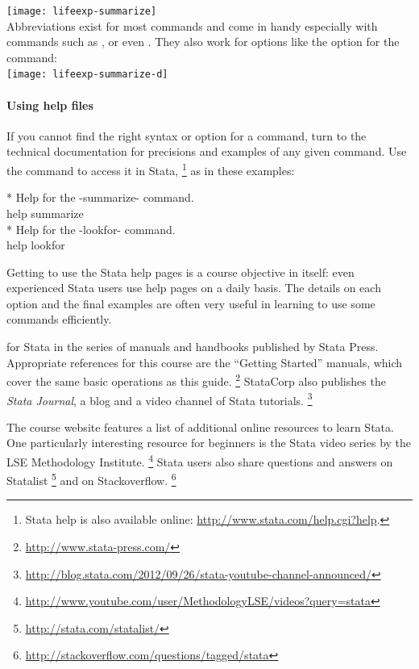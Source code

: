     \texttt{[image: lifeexp-summarize]}\\[1em]

  Abbreviations exist for most commands and come in handy especially with commands such as ,  or even . They also work for options like the  option for the  command:\\[1em]%

    \texttt{[image: lifeexp-summarize-d]}\\[1em]
  
    \paragraph{Using help files}%

    If you cannot find the right syntax or option for a command, turn to the technical documentation for precisions and examples of any given command. Use the  command to access it in Stata,%
        \footnote{Stata help is also available online: \url{http://www.stata.com/help.cgi?help}.} %
        as in these examples:%

    \begin{docspec}
      * Help for the -summarize- command.\\
      help summarize\\[1em]
  
      * Help for the -lookfor- command.\\
      help lookfor
    \end{docspec}

    Getting to use the Stata help pages is a course objective in itself: even experienced Stata users use help pages on a daily basis. The details on each option and the final examples are often very useful in learning to use some commands efficiently.%

     for Stata in the series of manuals and handbooks published by Stata Press. Appropriate references for this course are the ``Getting Started'' manuals, which cover the same basic operations as this guide.%
      \footnote{\url{http://www.stata-press.com/}} %
      StataCorp also publishes the \emph{Stata Journal}, a blog and a video channel of Stata tutorials.%
      \footnote{\url{http://blog.stata.com/2012/09/26/stata-youtube-channel-announced/}}
  
    The course website features a list of additional online resources to learn Stata. One particularly interesting resource for beginners is the Stata video series by the LSE Methodology Institute.%
      \footnote{\url{http://www.youtube.com/user/MethodologyLSE/videos?query=stata}} %
      Stata users also share questions and answers on Statalist%
      \footnote{\url{http://stata.com/statalist/}} %
      and on Stackoverflow.%
      \footnote{\url{http://stackoverflow.com/questions/tagged/stata}}

